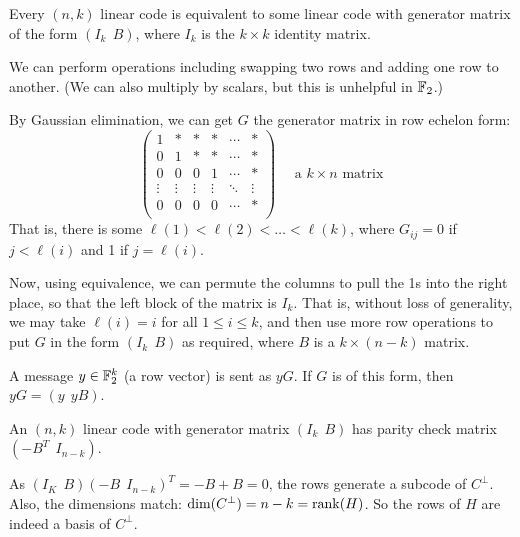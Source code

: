 \documentclass{article}
\begin{document}
\begin{proposition}[Equivalence]
    Every $(n, k)$ linear code is equivalent to some linear code with generator matrix of the form
    $(I_k \ \ B)$, where $I_k$ is the $k \times k$ identity matrix.
\end{proposition}

\begin{prf}
    We can perform operations including swapping two rows and adding one row to another.
    (We can also multiply by scalars, but this is unhelpful in $\mathbb{F}_2$.)
    
    By Gaussian elimination, we can get $G$ the generator matrix in row echelon form:
    \[
	\begin{pmatrix}
		1 & * & * & * & \cdots & * \\
		0 & 1 & * & * & \cdots & * \\
		0 & 0 & 0 & 1 & \cdots & * \\
		\vdots & \vdots & \vdots & \vdots & \ddots & \vdots \\
		0 & 0 & 0 & 0 & \cdots & * \\
	\end{pmatrix}
	\quad
	\text{ a $k \times n$ matrix}
	\]
	That is, there is some $\ell(1) < \ell(2) < \dots < \ell(k)$, where $G_{ij} = 0$ if $j < \ell(i)$ and 1 if $j = \ell(i)$.
	
	Now, using equivalence, we can permute the columns to pull the 1s into the right place, so that the left block of the matrix is $I_k$.
	That is, without loss of generality, we may take $\ell(i) = i$ for all $1 \leq i \leq k$, and then use more row operations to put $G$ in the form $(I_k \ \ B )$ as required, where $B$ is a $k \times (n-k)$ matrix.
\end{prf}

\begin{note}
	A message $y \in \mathbb{F}_2^k$ (a row vector) is sent as $yG$.
	If $G$ is of this form, then $yG = (y \ \ yB)$.
\end{note}

\begin{proposition}
    An $(n, k)$ linear code with generator matrix $(I_k \ \ B)$ has parity check matrix $(-B^T \ \ I_{n-k})$.
\end{proposition}

\begin{prf}
    As $(I_K \ \ B) (-B \ \ I_{n-k})^T = -B + B = 0$, the rows generate a subcode of $C^\bot$. Also, the dimensions match: $\dim(C^\bot) = n - k = \operatorname{rank}(H)$. So the rows of $H$ are indeed a basis of $C^\bot$.
\end{prf}
\end{document}
